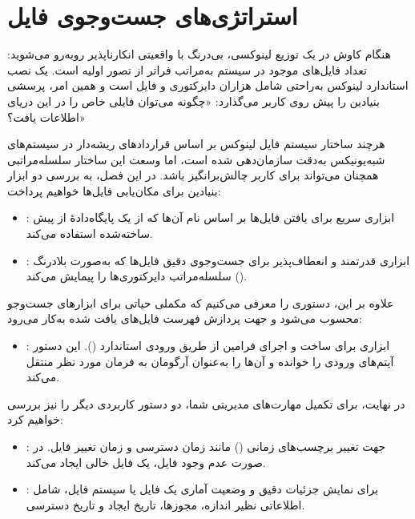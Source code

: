 \chapter{استراتژی‌های جست‌وجوی فایل}

هنگام کاوش در یک توزیع لینوکسی، بی‌درنگ با واقعیتی انکارناپذیر روبه‌رو می‌شوید: تعداد فایل‌های موجود در سیستم به‌مراتب فراتر از تصور اولیه است. یک نصب استاندارد لینوکس به‌راحتی شامل هزاران دایرکتوری و فایل است و همین امر، پرسشی بنیادین را پیش روی کاربر می‌گذارد: «چگونه می‌توان فایلی خاص را در این دریای اطلاعات یافت؟»

هرچند ساختار سیستم فایل لینوکس بر اساس قراردادهای ریشه‌دار در سیستم‌های شبه‌یونیکس به‌دقت سازمان‌دهی شده است، اما وسعت این ساختار سلسله‌مراتبی همچنان می‌تواند برای کاربر چالش‌برانگیز باشد. در این فصل، به بررسی دو ابزار بنیادین برای مکان‌یابی فایل‌ها خواهیم پرداخت:

\begin{itemize}
  \item {}: ابزاری سریع برای یافتن فایل‌ها بر اساس نام آن‌ها که از یک پایگاه‌دادهٔ از پیش ساخته‌شده استفاده می‌کند.
  \item {}: ابزاری قدرتمند و انعطاف‌پذیر برای جست‌وجوی دقیق فایل‌ها که به‌صورت بلادرنگ () سلسله‌مراتب دایرکتوری‌ها را پیمایش می‌کند.
\end{itemize}

علاوه بر این، دستوری را معرفی می‌کنیم که مکملی حیاتی برای ابزارهای جست‌وجو محسوب می‌شود و جهت پردازش فهرست فایل‌های یافت شده به‌کار می‌رود:

\begin{itemize}
  \item {}: ابزاری برای ساخت و اجرای فرامین از طریق ورودی استاندارد (). این دستور آیتم‌های ورودی را خوانده و آن‌ها را به‌عنوان آرگومان به فرمان مورد نظر منتقل می‌کند.
\end{itemize}

در نهایت، برای تکمیل مهارت‌های مدیریتی شما، دو دستور کاربردی دیگر را نیز بررسی خواهیم کرد:

\begin{itemize}
  \item {}: جهت تغییر برچسب‌های زمانی () مانند زمان دسترسی و زمان تغییر فایل. در صورت عدم وجود فایل، یک فایل خالی ایجاد می‌کند.
  \item {}: برای نمایش جزئیات دقیق و وضعیت آماری یک فایل یا سیستم فایل، شامل اطلاعاتی نظیر اندازه، مجوزها، تاریخ ایجاد و تاریخ دسترسی.
\end{itemize}

